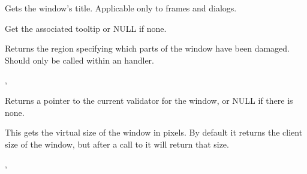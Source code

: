\label{wxwindowgettitle}


Gets the window's title. Applicable only to frames and dialogs.




\label{wxwindowgettooltip}


Get the associated tooltip or NULL if none.


\label{wxwindowgetupdateregion}


Returns the region specifying which parts of the window have been damaged. Should
only be called within an  handler.


,\rtfsp
{}


\label{wxwindowgetvalidator}


Returns a pointer to the current validator for the window, or NULL if there is none.


\label{wxwindowgetvirtualsize}



This gets the virtual size of the window in pixels. By default it
returns the client size of the window, but after a call to
 it will return
that size.




,\rtfsp
{}


\label{wxwindowgetwindowstyleflag}


